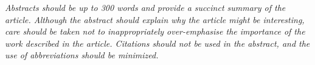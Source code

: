 \textit{Abstracts should be up to 300 words and provide a succinct summary of the article. Although the abstract should explain why the article might be interesting, care should be taken not to inappropriately over-emphasise the importance of the work described in the article. Citations should not be used in the abstract, and the use of abbreviations should be minimized.}
